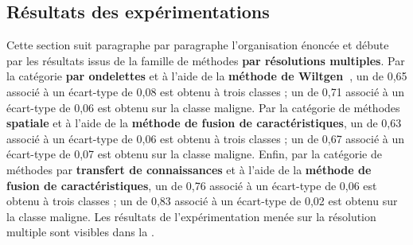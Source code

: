 \subsection{Résultats des expérimentations}
Cette section suit paragraphe par paragraphe l'organisation énoncée et débute par les résultats issus de la famille de méthodes \textbf{par résolutions multiples}. Par la catégorie \textbf{par ondelettes} et à l'aide de la \textbf{méthode de Wiltgen~}, un \fscore{} de 0,65 associé à un écart-type de 0,08 est obtenu à trois classes ; un \fscore{} de 0,71 associé à un écart-type de 0,06 est obtenu sur la classe maligne. Par la catégorie de méthodes \textbf{spatiale} et à l'aide de la \textbf{méthode de fusion de caractéristiques}, un \fscore{} de 0,63 associé à un écart-type de 0,06 est obtenu à trois classes ; un \fscore{} de 0,67 associé à un écart-type de 0,07 est obtenu sur la classe maligne. Enfin, par la catégorie de méthodes par \textbf{transfert de connaissances} et à l'aide de la \textbf{méthode de fusion de caractéristiques}, un \fscore{} de 0,76 associé à un écart-type de 0,06 est obtenu à trois classes ; un \fscore{} de 0,83 associé à un écart-type de 0,02 est obtenu sur la classe maligne. Les résultats de l'expérimentation menée sur la résolution multiple sont visibles dans la .\par

